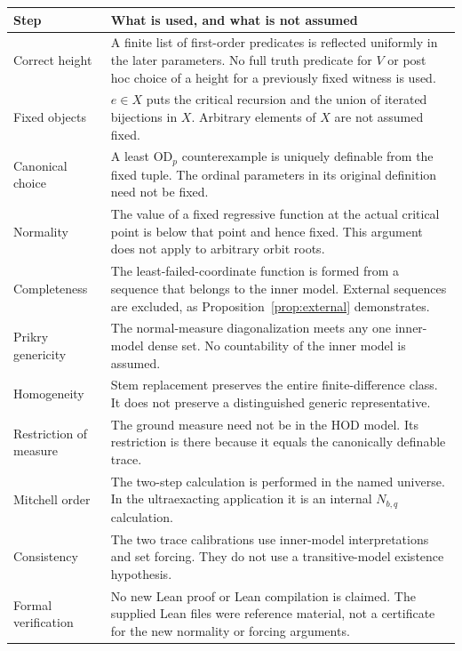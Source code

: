 \documentclass[11pt,letterpaper]{article}
\theoremstyle{definition}
\numberwithin{equation}{section}
\newcommand{\OD}{\mathrm{OD}}
\begin{document}
\begin{longtable}{@{}p{}p{}@{}}
\toprule
\textbf{Step} & \textbf{What is used, and what is not assumed}\\
\midrule
\endhead
Correct height & A finite list of first-order predicates is reflected
uniformly in the later parameters. No full truth predicate for $V$ or
post hoc choice of a height for a previously fixed witness is used.\\[4pt]
Fixed objects & $e\in X$ puts the critical recursion and the union of
iterated bijections in $X$. Arbitrary elements of $X$ are not assumed
fixed.\\[4pt]
Canonical choice & A least $\OD_p$ counterexample is uniquely definable
from the fixed tuple. The ordinal parameters in its original
definition need not be fixed.\\[4pt]
Normality & The value of a fixed regressive function at the actual
critical point is below that point and hence fixed. This argument does
not apply to arbitrary orbit roots.\\[4pt]
Completeness & The least-failed-coordinate function is formed from a
sequence that belongs to the inner model. External sequences are
excluded, as Proposition~\ref{prop:external} demonstrates.\\[4pt]
Prikry genericity & The normal-measure diagonalization meets any one
inner-model dense set. No countability of the inner model is assumed.\\[4pt]
Homogeneity & Stem replacement preserves the entire finite-difference
class. It does not preserve a distinguished generic representative.\\[4pt]
Restriction of measure & The ground measure need not be in the HOD
model. Its restriction is there because it equals the canonically
definable trace.\\[4pt]
Mitchell order & The two-step calculation is performed in the named
universe. In the ultraexacting application it is an internal
$N_{b,q}$ calculation.\\[4pt]
Consistency & The two trace calibrations use inner-model
interpretations and set forcing. They do not use a transitive-model
existence hypothesis.\\[4pt]
Formal verification & No new Lean proof or Lean compilation is claimed.
The supplied Lean files were reference material, not a certificate for
the new normality or forcing arguments.\\
\bottomrule
\end{longtable}
\end{document}
